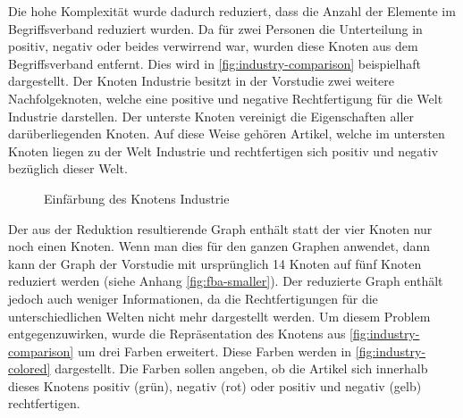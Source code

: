 Die hohe Komplexität wurde dadurch reduziert, dass die Anzahl der Elemente im Begriffsverband reduziert wurden.
Da für zwei Personen die Unterteilung in positiv, negativ oder beides verwirrend war, wurden diese Knoten aus dem Begriffsverband entfernt.
Dies wird in \autoref{fig:industry-comparison} beispielhaft dargestellt.
Der Knoten Industrie besitzt in der Vorstudie zwei weitere Nachfolgeknoten, welche eine positive und negative Rechtfertigung für die Welt Industrie darstellen.
Der unterste Knoten vereinigt die Eigenschaften aller darüberliegenden Knoten.
Auf diese Weise gehören Artikel, welche im untersten Knoten liegen zu der Welt Industrie und rechtfertigen sich positiv und negativ bezüglich dieser Welt.\\

\begin{figure}[!ht]
    \centering
    \caption{Einfärbung des Knotens Industrie}
    \label{fig:industry-colored}
\end{figure}

Der aus der Reduktion resultierende Graph enthält statt der vier Knoten nur noch einen Knoten.
Wenn man dies für den ganzen Graphen anwendet, dann kann der Graph der Vorstudie mit ursprünglich 14 Knoten auf fünf Knoten reduziert werden (siehe Anhang \autoref{fig:fba-smaller}).
Der reduzierte Graph enthält jedoch auch weniger Informationen, da die Rechtfertigungen für die unterschiedlichen Welten nicht mehr dargestellt werden.
Um diesem Problem entgegenzuwirken, wurde die Repräsentation des Knotens aus \autoref{fig:industry-comparison} um drei Farben erweitert.
Diese Farben werden in \autoref{fig:industry-colored} dargestellt.
Die Farben sollen angeben, ob die Artikel sich innerhalb dieses Knotens positiv (grün), negativ (rot) oder positiv und negativ (gelb) rechtfertigen.\\

